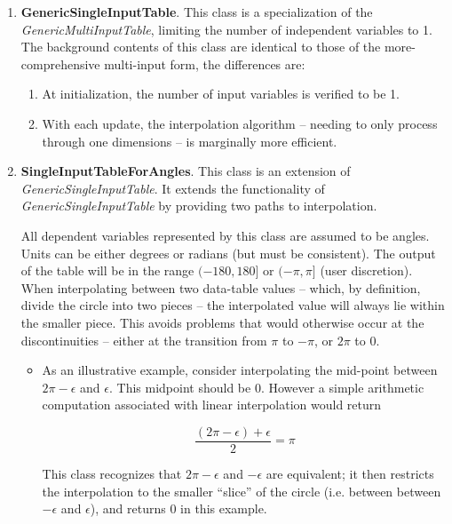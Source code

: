 \documentclass[11pt,fleqn]{report}
\begin{document}
\begin{enumerate}
\begin{enumerate}
   \item \textbf{GenericSingleInputTable}. This class is a specialization of
   the \textit{GenericMultiInputTable}, limiting the number of independent
   variables to 1. The background contents of this class are identical to those
   of the more-comprehensive multi-input form, the differences are:
     \begin{enumerate}
     \item At initialization, the number of input variables is verified to be
     1.
     \item With each update, the interpolation algorithm -- needing to only
     process through one dimensions -- is marginally more efficient.
     \end{enumerate}

   \item \textbf{SingleInputTableForAngles}.  This class is an extension of
    \textit{GenericSingleInputTable}.  It extends the functionality of
    \textit{GenericSingleInputTable} by providing two paths to interpolation.

    All dependent variables represented by this class are assumed to be
    angles.  Units can be either
    degrees or radians (but must be consistent).  The output of the table
    will be in the range $(-180,180]$ or $(-\pi,\pi]$ (user discretion).
    When interpolating
    between two data-table values -- which, by definition,
    divide the circle into two pieces -- the interpolated value will always
    lie within the smaller piece.  This avoids problems that would otherwise
    occur at the discontinuities -- either at the transition from
    $\pi$ to $-\pi$, or $2\pi$ to $0$.
    \begin{itemize}
     \item As an illustrative example, consider interpolating the mid-point
     between $2\pi - \epsilon$ and $\epsilon$.  This midpoint should be $0$.
     However a simple arithmetic computation associated with linear
      interpolation would
      return

      \begin{equation*}
      \frac{(2\pi - \epsilon) + \epsilon}{2} = \pi
      \end{equation*}

      This class recognizes that $2\pi - \epsilon$ and $- \epsilon$ are
      equivalent; it then restricts the interpolation to the smaller
      ``slice'' of the circle (i.e. between between $- \epsilon$ and
       $\epsilon$), and returns $0$ in this example.
    \end{itemize}


\end{enumerate}
\end{enumerate}
\end{document}
